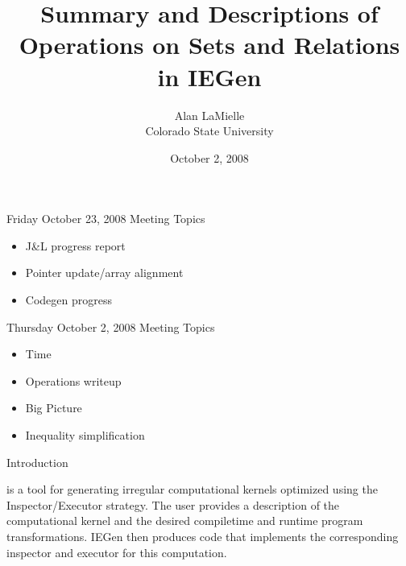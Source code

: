 \documentclass[journal,10pt]{IEEEtran}
\title{Summary and Descriptions of Operations on Sets and Relations in IEGen}
\author{Alan LaMielle \\
	Colorado State University}
\date{October 2, 2008}
\begin{document}
\maketitle

\begin{section}{Friday October 23, 2008 Meeting Topics}

\begin{itemize}
\item J\&L progress report
\item Pointer update/array alignment
\item Codegen progress
\end{itemize}

\end{section}

\begin{section}{Thursday October 2, 2008 Meeting Topics}

\begin{itemize}
\item Time
\item Operations writeup
\item Big Picture
\item Inequality simplification
\end{itemize}

\end{section}

\begin{section}{Introduction}

 is a tool for generating irregular computational kernels optimized using the Inspector/Executor strategy.
The user provides a description of the computational kernel and the desired compiletime and runtime program transformations.
IEGen then produces code that implements the corresponding inspector and executor for this computation.

\end{section}
\end{document}
